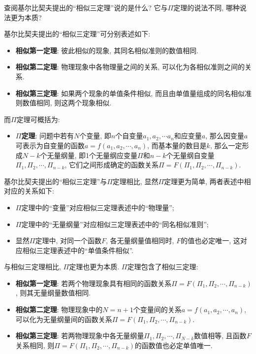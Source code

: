 \begin{problem}[07]
查阅基尔比契夫提出的``相似三定理''说的是什么? 它与$\Pi$定理的说法不同, 哪种说法更为本质?
\end{problem}
\begin{solution}
基尔比契夫提出的``相似三定理''可分别表述如下\cite{zlvo3}:
\begin{itemize}
\item \textbf{相似第一定理}: 彼此相似的现象, 其同名相似准则的数值相同.
\item \textbf{相似第二定理}: 物理现象中各物理量之间的关系, 可以化为各相似准则之间的关系.
\item \textbf{相似第三定理}: 如果两个现象的单值条件相似, 而且由单值量组成的同名相似准则数值相同, 则这两个现象相似.
\end{itemize}
而$\Pi$定理可概括为:
\begin{itemize}
\item \textbf{$\Pi$定理}: 问题中若有$N$个变量, 即$n$个自变量$a_1,a_2,\cdots a_n$和应变量$a$, 那么因变量$a$可表示为自变量的函数$a=f(a_1,a_2,\cdots, a_n)$, 而基本量的数目是$k$, 那么一定形成$N-k$个无量纲量, 即1个无量纲应变量$\Pi$和$n-k$个无量纲自变量$\Pi_1,\Pi_2,\cdots, \Pi_{n-k}$, 它们之间形成确定的函数关系$\Pi = F(\Pi_1,\Pi_2,\cdots, \Pi_{n-k})$.
\end{itemize}
基尔比契夫提出的``相似三定理''与$\Pi$定理相比, 显然$\Pi$定理更为简单, 两者表述中相对应的关系如下:
\begin{itemize}
\item $\Pi$定理中的``变量''对应相似三定理表述中的``物理量'';
\item $\Pi$定理中的``无量纲量''对应相似三定理表述中的``同名相似准则'';
\item 显然$\Pi$定理中, 对同一个函数$F$, 各无量纲量值相同时, $F$的值也必定唯一, 这对应相似三定理表述中的``单值条件相似''.
\end{itemize}
与相似三定理相比, $\Pi$定理也更为本质. $\Pi$定理包含了相似三定理: 
\begin{itemize}
\item \textbf{相似第一定理}: 若两个物理现象具有相同的函数关系$\Pi = F(\Pi_1,\Pi_2,\cdots, \Pi_{n-k})$, 则其无量纲量数值相同.
\item \textbf{相似第二定理}: 物理现象中的$N=n+1$个变量间的关系$a=f(a_1,a_2,\cdots, a_n)$, 可以化为无量纲量间的函数关系$\Pi = F(\Pi_1,\Pi_2,\cdots, \Pi_{n-k})$.
\item \textbf{相似第三定理}: 若两物理现象中各无量纲量$\Pi_1,\Pi_2,\cdots,\Pi_{N-k}$数值相等, 且函数$F$关系相同, 则$\Pi = F(\Pi_1,\Pi_2,\cdots, \Pi_{n-k})$的函数值也必定单值唯一.
\end{itemize}
\end{solution}
